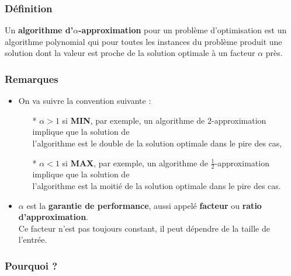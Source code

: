 \documentclass{article}
\newcommand{\quotecolor}[1]{\textcolor{quote}{#1}}
\begin{document}
\begin{sffamily}

\subsubsection*{Définition}
Un \textbf{algorithme d'$\alpha$-approximation} pour un problème d'optimisation est un algorithme polynomial qui \indent pour toutes les 
instances du problème produit une solution dont la valeur est proche de la solution optimale \indent à un facteur $\alpha$ près.

\subsubsection*{Remarques}
\begin{itemize}
\item On va suivre la convention suivante :
\begin{itemize}
\item[*]$\boxed{\alpha > 1}$ si \textbf{MIN}, par exemple, un algorithme de $2$-approximation implique que la
	  solution de \\l'algorithme est le double de la solution optimale dans le pire des cas,
\item[*]$\boxed{\alpha < 1}$ si \textbf{MAX}, par exemple, un algorithme de $\frac{1}{2}$-approximation implique que la
	  solution de \\l'algorithme est la moitié de la solution optimale dans le pire des cas.
\end{itemize}
\item $\alpha$ est la \textbf{garantie de performance}, aussi appelé \textbf{facteur} ou \textbf{ratio d'approximation}.\\
	  Ce facteur n'est pas toujours constant, il peut dépendre de la taille de l'entrée.
\end{itemize}

\subsubsection*{Pourquoi ?}


\end{sffamily}
\end{document}
